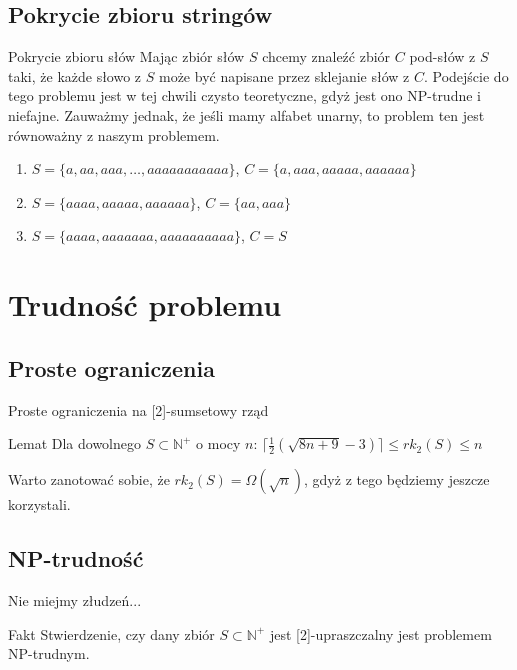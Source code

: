 \documentclass{beamer}
\newcommand{\N}{\mathbb{N}}
\begin{document}
	\subsection{Pokrycie zbioru stringów}
		\begin{frame}
			\begin{block}{Pokrycie zbioru słów}
                Mając zbiór słów $ S $ chcemy znaleźć zbiór $ C $ pod-słów z $ S $ taki, że każde słowo z $ S $ może być napisane przez sklejanie słów z $ C $.
                Podejście do tego problemu jest w tej chwili czysto teoretyczne, gdyż jest ono NP-trudne i niefajne.
                Zauważmy jednak, że jeśli mamy alfabet unarny, to problem ten jest równoważny z naszym problemem.
                \begin{enumerate}
				    \pause \item $ S = \lbrace a,aa,aaa,\dots,aaaaaaaaaaa \rbrace $, $ C = \lbrace a,aaa,aaaaa,aaaaaa \rbrace $
				    \pause \item $ S = \lbrace aaaa,aaaaa,aaaaaa \rbrace $, $ C = \lbrace aa,aaa \rbrace $
				    \pause \item $ S = \lbrace aaaa,aaaaaaa,aaaaaaaaaa \rbrace $, $ C = S $
                \end{enumerate}
			\end{block}
		\end{frame}
		
\section{Trudność problemu}
	\subsection{Proste ograniczenia}
		\begin{frame}{Proste ograniczenia na [2]-sumsetowy rząd}
            \begin{block}{Lemat}
			    Dla dowolnego $ S \subset \N^{+} $ o mocy $ n $:
                $ \lceil \frac{1}{2} ( \sqrt{8n + 9} - 3 ) \rceil \leq rk_2(S) \leq n $
            \end{block}
            
            \pause
            \vspace{\baselineskip}
            Warto zanotować sobie, że $ rk_2(S) = \Omega \left( \sqrt{n} \right) $, gdyż z tego będziemy jeszcze korzystali.
		\end{frame}
		
	\subsection{NP-trudność}
		\begin{frame}{Nie miejmy złudzeń...}
			\begin{exampleblock}{Fakt}
				Stwierdzenie, czy dany zbiór $ S \subset \N^{+} $ jest [2]-upraszczalny jest problemem NP-trudnym.
			\end{exampleblock}
		\end{frame}
		
\end{document}
